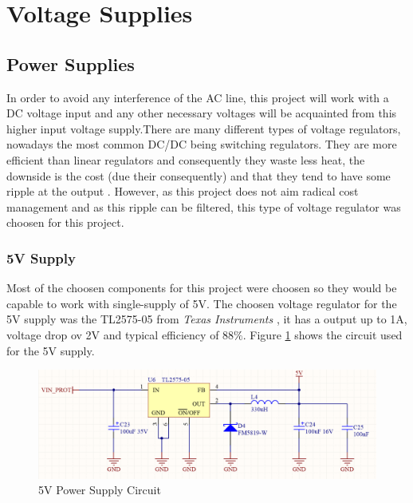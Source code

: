 \section{Voltage Supplies}\label{sec:voltage-supplies}

	\subsection{Power Supplies}\label{ssec:power-supplies}
		In order to avoid any interference of the AC line, this project will work with a DC voltage input and any other necessary voltages will be acquainted from this higher input voltage supply.There are many different types of voltage regulators, nowadays the most common DC/DC being switching regulators. They are more efficient than linear regulators and consequently they waste less heat, the downside is the cost (due their consequently) and that they tend to have some ripple at the output \cite{schweber2017}. However, as this project does not aim radical cost management and as this ripple can be filtered, this type of voltage regulator was choosen for this project.

		\subsubsection{5V Supply}\label{sssec:5v-supply}
			Most of the choosen components for this project were choosen so they would be capable to work with single-supply of 5V. The choosen voltage regulator for the 5V supply was the TL2575-05 from \textit{Texas Instruments} \cite{tl2575-05-datasheet}, it has a output up to 1A, voltage drop ov 2V and typical efficiency of 88$\%$. Figure \ref{fig:tl2575-05-circuit} shows the circuit used for the 5V supply.

			\begin{figure}[htbp]
				\centering
					\includegraphics[scale=2]{figuras/fig-tl2575-05-circuit.png}
				\caption{5V Power Supply Circuit \cite{tl2575-05-circuit}}
				\label{fig:tl2575-05-circuit}
			\end{figure}

